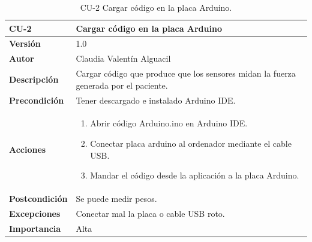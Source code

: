 \begin{table}[p]
	\centering
	\begin{tabularx}{\linewidth}{ p{} p{} }
		\toprule
		\textbf{CU-2}    & \textbf{Cargar código en la placa Arduino }\\
		\toprule
		\textbf{Versión}              & 1.0    \\
		\textbf{Autor}                & Claudia Valentín Alguacil \\
		
		\textbf{Descripción}          & Cargar código que produce que los sensores midan la fuerza generada por el paciente.  \\
		\textbf{Precondición}         & Tener descargado e instalado Arduino IDE. \\
		\textbf{Acciones}             &
		\begin{enumerate}
			\def\labelenumi{\arabic{enumi}.}
			\tightlist
			\item Abrir código Arduino.ino en Arduino IDE.
			\item Conectar placa arduino al ordenador mediante el cable USB.
                \item Mandar el código desde la aplicación a la placa Arduino.
		\end{enumerate}\\
		\textbf{Postcondición}        &  Se puede medir pesos. \\
		\textbf{Excepciones}          & Conectar mal la placa o cable USB roto. \\
		\textbf{Importancia}          & Alta \\
		\bottomrule
	\end{tabularx}
	\caption{CU-2 Cargar código en la placa Arduino.}
\end{table}

